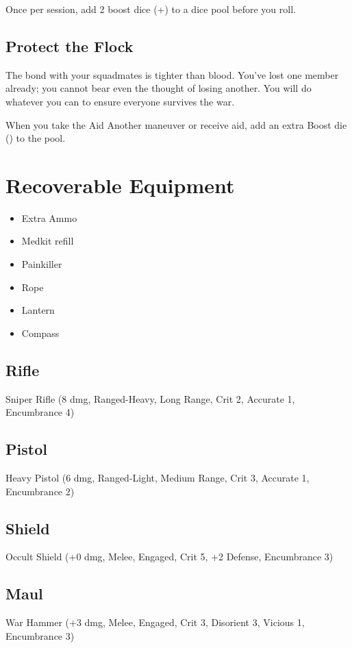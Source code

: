 \documentclass{book}
\newcommand{\bbb}{\BoostDie }
\begin{document}
\begin{multicols}{2}
Once per session, add 2 boost dice (+\bbb\bbb) to a dice pool before you roll.

\subsection{Protect the Flock}

The bond with your squadmates is tighter than blood.  You've lost one member already; you cannot bear even the thought of losing another.  You will do whatever you can to ensure everyone survives the war.

When you take the Aid Another maneuver or receive aid, add an extra Boost die (\bbb) to the pool.

\section{Recoverable Equipment}

\begin{itemize}
    \item Extra Ammo
    \item Medkit refill
    \item Painkiller
    \item Rope
    \item Lantern
    \item Compass
\end{itemize}

\subsection{Rifle}

Sniper Rifle (8 dmg, Ranged-Heavy, Long Range, Crit 2, Accurate 1, Encumbrance 4)

\subsection{Pistol}

Heavy Pistol (6 dmg, Ranged-Light, Medium Range, Crit 3, Accurate 1, Encumbrance 2)

\subsection{Shield}

Occult Shield (+0 dmg, Melee, Engaged, Crit 5, +2 Defense, Encumbrance 3)

\subsection{Maul}

War Hammer (+3 dmg, Melee, Engaged, Crit 3, Disorient 3, Vicious 1, Encumbrance 3)



\end{multicols}
\end{document}
